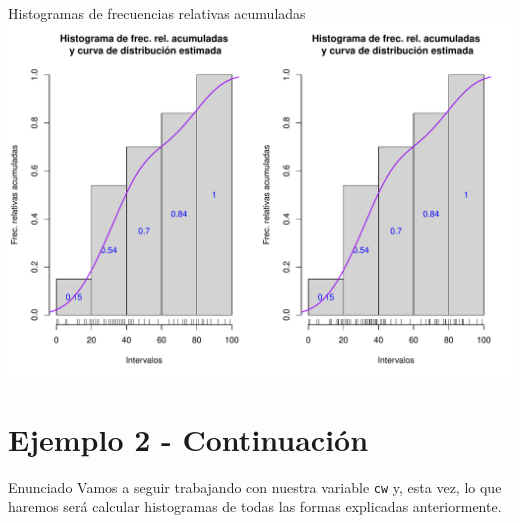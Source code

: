 \documentclass[
  ignorenonframetext,
]{beamer}
\begin{document}
\begin{frame}{Histogramas de frecuencias relativas acumuladas}
\label{histogramas-de-frecuencias-relativas-acumuladas-2}
\includegraphics{R_base_files/figure-beamer/unnamed-chunk-243-1.pdf}
\end{frame}

\section{Ejemplo 2 - Continuación}\label{ejemplo-2---continuaciuxf3n-1}

\begin{frame}[fragile]{Enunciado}
\label{enunciado-4}
Vamos a seguir trabajando con nuestra variable \texttt{cw} y, esta vez,
lo que haremos será calcular histogramas de todas las formas explicadas
anteriormente.
\end{frame}
\end{document}
